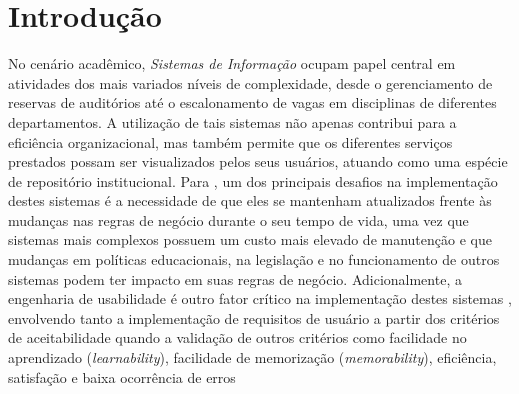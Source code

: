 \documentclass[nonacm, sigconf]{acmart}
\begin{document}


\makeatletter
{}
\makeatother


\maketitle

\section{Introdução}
\label{section:intro}

No cenário acadêmico, \textit{Sistemas de Informação} ocupam papel central em atividades dos mais variados níveis de complexidade, desde o gerenciamento de reservas de auditórios até o escalonamento de vagas em disciplinas de diferentes departamentos. A utilização de tais sistemas não apenas contribui para a eficiência organizacional, mas também permite que os diferentes serviços prestados possam ser visualizados pelos seus usuários, atuando como uma espécie de repositório institucional. Para \cite{sis}, um dos principais desafios na implementação destes sistemas é a necessidade de que eles se mantenham atualizados frente às mudanças nas regras de negócio durante o seu tempo de vida, uma vez que sistemas mais complexos possuem um custo mais elevado de manutenção e que mudanças em políticas educacionais, na legislação e no funcionamento de outros sistemas podem ter impacto em suas regras de negócio. Adicionalmente, a engenharia de usabilidade é outro fator crítico na implementação destes sistemas \cite{nielsen1994usability}, envolvendo tanto a implementação de requisitos de usuário a partir dos critérios de aceitabilidade quando a validação de outros critérios como facilidade no aprendizado (\textit{learnability}), facilidade de memorização (\textit{memorability}), eficiência, satisfação e baixa ocorrência de erros
\end{document}
